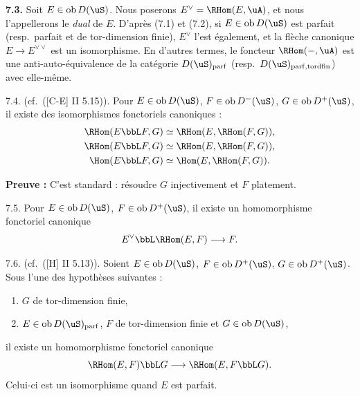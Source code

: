 \bigskip
\noindent\textbf{7.3.} Soit $E \in \operatorname{ob} D(\uS)$. Nous poserons $E^{\vee} = \RHom(E,\uA)$, et nous l'appellerons le \emph{dual} de $E$. D'apr\`{e}s (7.1) et (7.2), si $E \in \operatorname{ob} D(\uS)$ est parfait (resp.~parfait et de tor-dimension finie), $E^{\vee}$ l'est \'{e}galement, et la fl\`{e}che canonique $E \rightarrow E^{\vee\vee}$ est un isomorphisme. En d'autres termes, le foncteur $\RHom(-,\uA)$ est une anti-auto-\'{e}quivalence de la cat\'{e}gorie $D(\uS)_{\mathrm{parf}}$ (resp.~$D(\uS)_{\mathrm{parf},\mathrm{tordfin}}$) avec elle-m\^{e}me.

\begin{proposition} 7.4. (cf.~([C-E] II 5.15)).
Pour $E \in \operatorname{ob} D(\uS)$, $F \in \operatorname{ob} D^-(\uS)$, $G \in \operatorname{ob} D^+(\uS)$, il existe des isomorphismes fonctoriels canoniques :
\begin{align*}
\RHom(E \bbL F, G) &\simeq \RHom(E, \RHom(F,G)) , \\
\RHom(E \bbL F, G) &\simeq \RHom(E, \RHom(F,G)) , \\
\Hom(E \bbL F, G) &\simeq \Hom(E, \RHom(F,G)) .
\end{align*}
\end{proposition}

\noindent\textbf{Preuve :} C'est standard : r\'{e}soudre $G$ injectivement et $F$ platement.

\begin{lemme} 7.5.
Pour $E \in \operatorname{ob} D(\uS)$, $F \in \operatorname{ob} D^+(\uS)$, il existe un homomorphisme fonctoriel canonique
\[
E^{\vee} \bbL \RHom(E,F) \longrightarrow F .
\]
\end{lemme}

\begin{proposition} 7.6. (cf.~([H] II 5.13)).
Soient $E \in \operatorname{ob} D(\uS)$, $F \in \operatorname{ob} D^+(\uS)$, $G \in \operatorname{ob} D^+(\uS)$. Sous l'une des hypoth\`{e}ses suivantes :
\begin{enumerate}
\item[i)] $G$ de tor-dimension finie,
\item[ii)] $E \in \operatorname{ob} D(\uS)_{\mathrm{parf}}$, $F$ de tor-dimension finie et $G \in \operatorname{ob} D(\uS)$,
\end{enumerate}
il existe un homomorphisme fonctoriel canonique
\[
\RHom(E,F) \bbL G \longrightarrow \RHom(E, F \bbL G) .
\]
Celui-ci est un isomorphisme quand $E$ est parfait.
\end{proposition}

